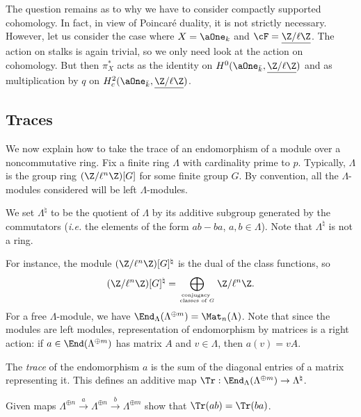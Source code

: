 The question remains as to why we have to consider compactly supported cohomology. In fact, in view of Poincar\'e duality, it is not strictly necessary. However, let us consider the case where $X = \aOne_k$ and $\cF = \underline{\Z/\ell\Z}$. The action on stalks is again trivial, so we only need look at the action on cohomology. But then $\pi_X^*$ acts as the identity on $H^0(\aOne_{\bar k}, \underline{\Z/\ell\Z})$ and as multiplication by $q$ on $H^2_c(\aOne_{\bar k}, \underline{\Z/\ell\Z})$. 

\subsection{Traces}

We now explain how to take the trace of an endomorphism of a module over a noncommutative ring. Fix a finite ring $\Lambda$ with cardinality prime to $p$. Typically, $\Lambda$ is the group ring $(\Z/\ell^n\Z)[G]$ for some finite group $G$. By convention, all the $\Lambda$-modules considered will be left $\Lambda$-modules.

\begin{notation}
We set $\Lambda^\natural$ to be the quotient of $\Lambda$ by its additive subgroup generated by the commutators ({\it i.e.} the elements of the form $ab-ba$, $a, b \in \Lambda$). Note that $\Lambda^\natural$ is not a ring. 
\end{notation}

For instance, the module $(\Z/\ell^n\Z)[G]^\natural$ is the dual of the class functions, so 
$$
(\Z/\ell^n\Z)[G]^\natural = \bigoplus_{\text{conjugacy } \atop \text{classes of $G$}} \Z/\ell^n\Z.
$$ 
For a free $\Lambda$-module, we have $\End_\Lambda(\Lambda^{\oplus m}) = \Mat_n(\Lambda)$. Note that since the modules are left modules, representation of endomorphism by matrices is a right action: if $a \in \End(\Lambda^{\oplus m})$ has matrix $A$ and $v \in \Lambda$, then $a(v) = v A$.

\begin{defi}
The \emph{trace} of the endomorphism $a$ is the sum of the diagonal entries of a matrix representing it. This defines an additive map $\Tr : \End_\Lambda(\Lambda^{\oplus m}) \to \Lambda^\natural$.
\end{defi}

\begin{exo} 
Given maps $\Lambda^{\oplus n} \xrightarrow{a} \Lambda^{\oplus n} \xrightarrow{b} \Lambda^{\oplus m}$ show that $\Tr(ab) = \Tr(ba)$. 
\end{exo}

